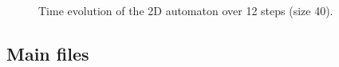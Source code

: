\documentclass[12pt,a4paper]{article}
\begin{document}
\begin{figure}[H]
    \begin{minipage}[b]{0.25\textwidth}
        \centering
        \caption*{\small $t=10$}
    \end{minipage}
    \hspace{0.1cm}
    \begin{minipage}[b]{0.25\textwidth}
        \centering
        \caption*{\small $t=11$}
    \end{minipage}
    \hspace{0.1cm}
    \begin{minipage}[b]{0.25\textwidth}
        \centering
        \caption*{\small $t=12$}
    \end{minipage}
    \vspace{0.3cm}


    \caption{\small Time evolution of the 2D automaton over 12 steps (size 40).}
    \label{fig:2d_evolution}
\end{figure}


\newpage


\subsection{Main files}
\end{document}
